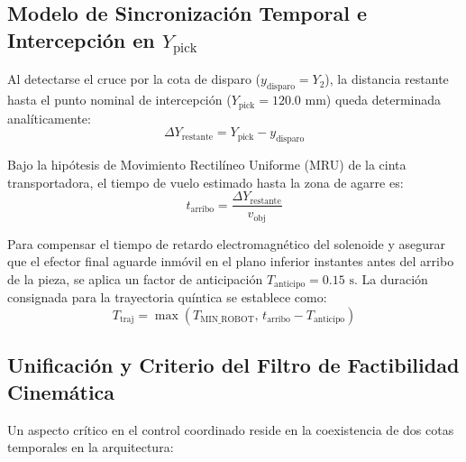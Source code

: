 \documentclass[12pt, a4paper]{report}
\begin{document}
\subsection{Modelo de Sincronización Temporal e Intercepción en $Y_{\text{pick}}$}
Al detectarse el cruce por la cota de disparo ($y_{\text{disparo}} = Y_2$), la distancia restante hasta el punto nominal de intercepción ($Y_{\text{pick}} = 120.0\text{ mm}$) queda determinada analíticamente:
\begin{equation}
    \Delta Y_{\text{restante}} = Y_{\text{pick}} - y_{\text{disparo}}
\end{equation}

Bajo la hipótesis de Movimiento Rectilíneo Uniforme (MRU) de la cinta transportadora, el tiempo de vuelo estimado hasta la zona de agarre es:
\begin{equation}
    t_{\text{arribo}} = \frac{\Delta Y_{\text{restante}}}{v_{\text{obj}}}
\end{equation}

Para compensar el tiempo de retardo electromagnético del solenoide y asegurar que el efector final aguarde inmóvil en el plano inferior instantes antes del arribo de la pieza, se aplica un factor de anticipación $T_{\text{anticipo}} = 0.15\text{ s}$. La duración consignada para la trayectoria quíntica se establece como:
\begin{equation}
    T_{\text{traj}} = \max\left(T_{\text{MIN\_ROBOT}},\, t_{\text{arribo}} - T_{\text{anticipo}}\right)
\end{equation}

\subsection{Unificación y Criterio del Filtro de Factibilidad Cinemática}
Un aspecto crítico en el control coordinado reside en la coexistencia de dos cotas temporales en la arquitectura:
\end{document}
